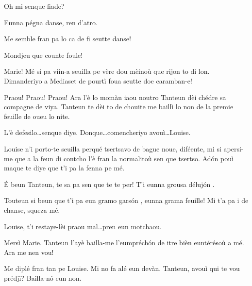 \begin{drama}


\Alicespeaks{} Oh mi senque fiade?

\Tanteunspeaks Eunna pégna danse, ren d'atro.

\Sperancespeaks Me semble fran pa lo ca de fi seutte danse!

\Tanteunspeaks Mondjeu que counte foule!


\Alicespeaks Marie! Mé si pa viin-a seuilla pe vère dou mèinoù que rijon to di lon. Dimanderiyo a Mediaset de pourtì foua seutte doe caramban-e!

\Mariespeaks Praou! Praou! Praou! Ara l'è lo mo\-màn iaou noutro Tanteun dèi chédre sa compagne de viya. Tanteun te dèi to de chouite me baillì lo non de la premie feuille de oueu lo nite.

\Tanteunspeaks{} L'è defesilo\ldots senque diye. Donque\ldots comencheriyo avouì\ldots Louise.


\Tanteunspeaks Louise n'i porto-te seuilla perqué tsertsavo de bague noue, diféente, mi si apersi-me que a la feun di contcho l'è fran la normalitoù sen que tsertso. Ad\'on pouì maque te diye que t'i pa la fenna pe mé.

\Louisespeaks {} \'E beun Tanteun, te sa pa sen que te te per! T'i eunna grousa déluj\'on .

\Tanteunspeaks Touteun si beun que t'i pa eun gramo gars\'on , eunna grama feuille! Mi t'a pa i de chanse, squeza-mé.

\Mariespeaks Louise, t’i restaye-lèi praou mal\ldots pren eun motchaou.


\Louisespeaks Mersì Marie. Tanteun l’ayè bailla-me l’eumpréch\'on de itre bièn euntérésoù a mé. Ara me nen vou!


\Mariespeaks Me diplé fran tan pe Louise. Mi no fa alé eun devàn. Tanteun, avouì qui te vou prédjì? Bailla-n\'o eun non.


\end{drama}
